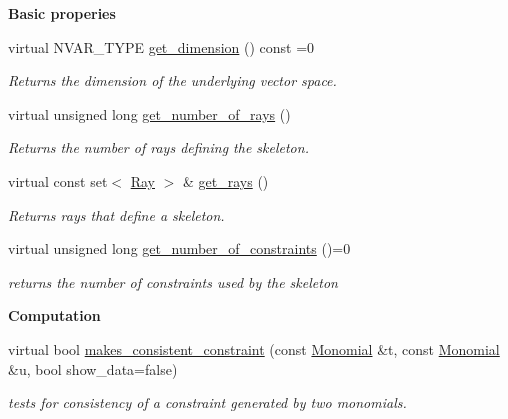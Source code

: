 \begin{Indent}\textbf{ Basic properies}\par
\begin{DoxyCompactItemize}
\item 
\mbox{\label{group___c_l_s_solvers_a5801b4bd5322a78e0cf3dcad83383a2e}} 
virtual N\+V\+A\+R\+\_\+\+T\+Y\+PE \hyperlink{group___c_l_s_solvers_a5801b4bd5322a78e0cf3dcad83383a2e}{get\+\_\+dimension} () const =0
\begin{DoxyCompactList}\small\item\em Returns the dimension of the underlying vector space. \end{DoxyCompactList}\item 
\mbox{\label{group___c_l_s_solvers_a7a8d455722e6ae8b0bc9928dcd1bfa48}} 
virtual unsigned long \hyperlink{group___c_l_s_solvers_a7a8d455722e6ae8b0bc9928dcd1bfa48}{get\+\_\+number\+\_\+of\+\_\+rays} ()
\begin{DoxyCompactList}\small\item\em Returns the number of rays defining the skeleton. \end{DoxyCompactList}\item 
virtual const set$<$ \hyperlink{group___c_l_s_solvers_class_l_p___solvers_1_1_ray}{Ray} $>$ \& \hyperlink{group___c_l_s_solvers_a52f7a4068e9d36500d1dcdf35757cd06}{get\+\_\+rays} ()
\begin{DoxyCompactList}\small\item\em Returns rays that define a skeleton. \end{DoxyCompactList}\item 
virtual unsigned long \hyperlink{group___c_l_s_solvers_a05697a4527b15e26b5e0ae9088a46ed5}{get\+\_\+number\+\_\+of\+\_\+constraints} ()=0
\begin{DoxyCompactList}\small\item\em returns the number of constraints used by the skeleton \end{DoxyCompactList}\end{DoxyCompactItemize}
\end{Indent}
\begin{Indent}\textbf{ Computation}\par
\begin{DoxyCompactItemize}
\item 
\mbox{\label{group___c_l_s_solvers_abb6c3f1320ea90c0a81960642a503b37}} 
virtual bool \hyperlink{group___c_l_s_solvers_abb6c3f1320ea90c0a81960642a503b37}{makes\+\_\+consistent\+\_\+constraint} (const \hyperlink{group__polygroup_class_monomial}{Monomial} \&t, const \hyperlink{group__polygroup_class_monomial}{Monomial} \&u, bool show\+\_\+data=false)
\begin{DoxyCompactList}\small\item\em tests for consistency of a constraint generated by two monomials. \end{DoxyCompactList}\end{DoxyCompactItemize}
\end{Indent}
